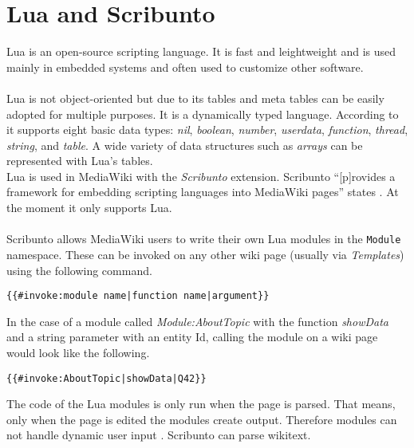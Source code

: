 \section{Lua and Scribunto}


Lua is an open-source scripting language. It is fast and leightweight and is used mainly in embedded systems and often used to customize other software. \citep{lua:01} \\
\\
Lua is not object-oriented but due to its tables and meta tables can be easily adopted for multiple purposes. It is a dynamically typed language. According to \citet[9]{luabook:01} it supports eight basic data types: \textit{nil}, \textit{boolean}, \textit{number}, \textit{userdata}, \textit{function}, \textit{thread}, \textit{string}, and \textit{table}. A wide variety of data structures such as \textit{arrays} can be represented with Lua's tables. \\
Lua is used in MediaWiki with the \textit{Scribunto} extension. Scribunto ``[p]rovides a framework for embedding scripting languages into MediaWiki pages'' states \citet{wiki:19}. At the moment it only supports Lua. \\
\\
Scribunto allows MediaWiki users to write their own Lua modules in the \texttt{\justify Module} namespace. These can be invoked on any other wiki page (usually via \textit{Templates}) using the following command.
\begin{lstlisting}[frame=single] 
{{#invoke:module name|function name|argument}}
\end{lstlisting}

In the case of a module called \textit{Module:AboutTopic} with the function \textit{showData} and a string parameter with an entity Id, calling the module on a wiki page would look like the following.
\begin{lstlisting}[frame=single] 
{{#invoke:AboutTopic|showData|Q42}}
\end{lstlisting}

The code of the Lua modules is only run when the page is parsed. That means, only when the page is edited the modules create output. Therefore modules can not handle dynamic user input \citep{wiki:20}. Scribunto can parse wikitext. 
